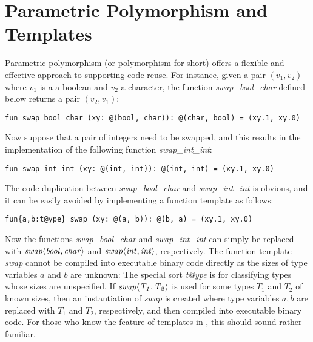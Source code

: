 \section{Parametric Polymorphism and Templates}
Parametric polymorphism (or polymorphism for short) offers a flexible and
effective approach to supporting code reuse. For instance, given a pair $(v_1,
v_2)$ where $v_1$ is a a boolean and $v_2$ a character, the function {\it
swap\_bool\_char} defined below returns a pair $(v_2, v_1)$:
\begin{verbatim}
fun swap_bool_char (xy: @(bool, char)): @(char, bool) = (xy.1, xy.0)
\end{verbatim}
Now suppose that a pair of integers need to be swapped, and this results in
the implementation of the following function {\it swap\_int\_int}:
\begin{verbatim}
fun swap_int_int (xy: @(int, int)): @(int, int) = (xy.1, xy.0)
\end{verbatim}
The code duplication between {\it swap\_bool\_char} and {\it
swap\_int\_int} is obvious, and it can be easily avoided by implementing a
function template as follows:
\begin{verbatim}
fun{a,b:t@ype} swap (xy: @(a, b)): @(b, a) = (xy.1, xy.0)
\end{verbatim}
Now the functions {\it swap\_bool\_char} and {\it swap\_int\_int} can
simply be replaced with ${\it swap\langle bool,char\rangle}$ and ${\it
swap\langle int,int\rangle}$, respectively. The function template {\it
swap} cannot be compiled into executable binary code directly as the sizes
of type variables $a$ and $b$ are unknown: The special sort {\it t@ype} is
for classifying types whose sizes are unspecified. If ${\it swap\langle
T_1,T_2\rangle}$ is used for some types $T_1$ and $T_2$ of known sizes,
then an instantiation of {\it swap} is created where type variables $a,b$
are replaced with $T_1$ and $T_2$, respectively, and then compiled into
executable binary code. For those who know the feature of templates in
\cplusplus, this should sound rather familiar.

